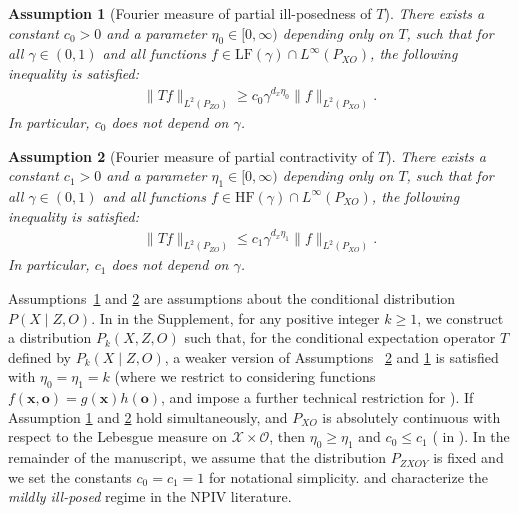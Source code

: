 \documentclass[11pt]{article}
\newcommand{\bx}{\mathbf x}
\newcommand{\bo}{\mathbf o}
\newcommand{\calO}{\mathcal{O}}
\newcommand{\calX}{\mathcal{X}}
\newcommand{\0}{\mathbf{0}}
\newtheorem{ass}{Assumption}[section]
\begin{document}
\begin{ass}[Fourier measure of partial ill-posedness of $T$]
\label{ass:T_frequency_ill_posedness}
There exists a constant $c_0>0$ and a parameter $\eta_0\in [0,\infty)$ depending only on $T$, such that for all $\gamma \in (0,1)$ and all functions $f \in \mathrm{LF}(\gamma) \cap L^\infty(P_{XO})$, the following inequality is satisfied:
    \begin{align*}
    \|Tf\|_{L^2(P_{ZO})} \geq c_0\gamma^{d_x\eta_0} \|f\|_{L^2(P_{XO})}.
    \end{align*}
In particular, $c_0$ does not depend on $\gamma$. 
\end{ass}
\begin{ass}[Fourier measure of partial contractivity of $T$]
\label{ass:T_contractivity}
There exists a constant $c_1>0$ and a parameter $\eta_1\in [0,\infty)$ depending only on $T$, such that for all $\gamma \in (0,1)$ and all functions $f \in \mathrm{HF}(\gamma) \cap L^\infty(P_{XO})$, the following inequality is satisfied:
    \begin{align*}
    \|Tf\|_{L^2(P_{ZO})} \leq c_1\gamma^{d_x\eta_1} \|f\|_{L^2(P_{XO})} .
    \end{align*}
In particular, $c_1$ does not depend on $\gamma$. 
\end{ass}

Assumptions~\ref{ass:T_frequency_ill_posedness} and \ref{ass:T_contractivity} are assumptions about the conditional distribution $P(X\mid Z,O)$. In  in the Supplement, for any positive integer $k\geq 1$, we construct a distribution $P_k(X,Z,O)$ such that, for the conditional expectation operator $T$ defined by $P_k(X\mid Z,O)$, a weaker version of Assumptions~ \ref{ass:T_contractivity} and \ref{ass:T_frequency_ill_posedness} is satisfied with $\eta_0 = \eta_1 = k$ (where we restrict to considering functions $f(\bx,\bo) = g(\bx)h(\bo)$, and impose a further technical restriction for ).
If Assumption \ref{ass:T_frequency_ill_posedness} and \ref{ass:T_contractivity} hold simultaneously, and $P_{XO}$ is absolutely continuous with respect to the Lebesgue measure on $\calX\times\calO$, then $\eta_0\geq \eta_1$ and $c_0\leq c_1$ ( in ).
In the remainder of the manuscript, we assume that the distribution $P_{ZXOY}$ is fixed and we set the constants $c_0 = c_1 = 1$ for notational simplicity.  and  characterize the \emph{mildly ill-posed} regime in the NPIV literature. 
\end{document}
